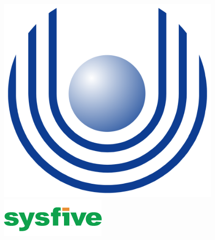 \title{\titel}
\author{\autor}

\setcounter{secnumdepth}{3}
\setcounter{tocdepth}{3}

\fancyfoot[OR]{}%
\fancyfoot[EL]{}%
\fancyfoot[OL]{}%
\fancyfoot[ER]{}%

\begin{titlepage}
\begin{figure}
    \begin{minipage}{0.2\textwidth}
        \begin{flushleft}    
            \includegraphics[scale=0.20]{images/logo_left.png}
        \end{flushleft}
    \end{minipage}  
    \begin{minipage}{0.55\textwidth}
        \centering
        \hspace{0.25cm}
    \end{minipage}
    \begin{minipage}{0.2\textwidth}
        \begin{flushleft}   
            \includegraphics[scale=0.5]{images/logo_right.png}
        \end{flushleft}

\end{minipage}
\end{figure}
\end{titlepage}

